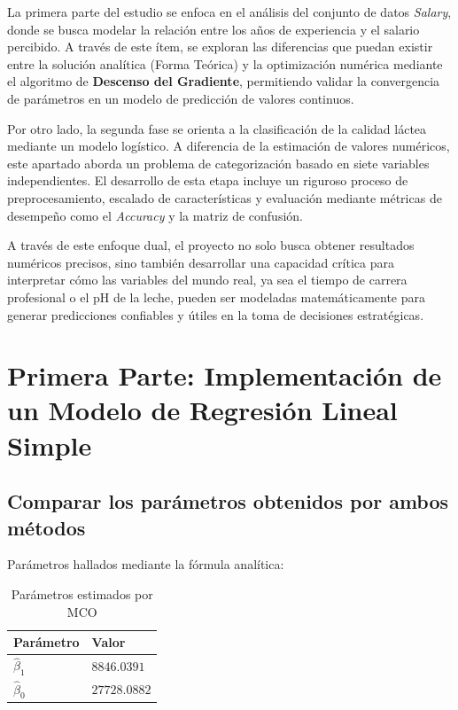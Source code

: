 \documentclass[12pt,a4paper]{article}
\begin{document}
La primera parte del estudio se enfoca en el análisis del conjunto de datos \textit{Salary}, donde se busca modelar la relación entre los años de experiencia y el salario percibido. A través de este ítem, se exploran las diferencias que puedan existir entre la solución analítica (Forma Teórica) y la optimización numérica mediante el algoritmo de \textbf{Descenso del Gradiente}, permitiendo validar la convergencia de parámetros en un modelo de predicción de valores continuos.

Por otro lado, la segunda fase se orienta a la clasificación de la calidad láctea mediante un modelo logístico. A diferencia de la estimación de valores numéricos, este apartado aborda un problema de categorización basado en siete variables independientes. El desarrollo de esta etapa incluye un riguroso proceso de preprocesamiento, escalado de características y evaluación mediante métricas de desempeño como el \textit{Accuracy} y la matriz de confusión.



A través de este enfoque dual, el proyecto no solo busca obtener resultados numéricos precisos, sino también desarrollar una capacidad crítica para interpretar cómo las variables del mundo real, ya sea el tiempo de carrera profesional o el pH de la leche, pueden ser modeladas matemáticamente para generar predicciones confiables y útiles en la toma de decisiones estratégicas.
\newpage
\section{Primera Parte: Implementación de un Modelo de Regresión Lineal Simple}

\subsection{Comparar los parámetros obtenidos por ambos métodos}

	Parámetros hallados mediante la fórmula analítica:

		\begin{table}[h!]
		\centering
		\begin{tabular}{ll}
		\hline
		\textbf{Parámetro} & \textbf{Valor} \\
		\hline
		$\hat{\beta}_1$ & $8846.0391$ \\
		$\hat{\beta}_0$ & $27728.0882$ \\
		\hline
		\end{tabular}
		\caption{Parámetros estimados por MCO}
		\end{table}
\end{document}
